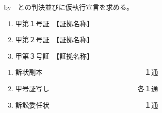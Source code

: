 \documentclass{ltjsarticle}
\begin{document}
{\advance\leftskip by -\parindent
との判決並びに仮執行宣言を求める。\par}

\vspace{1\zw}















\vspace{1\zw}



\begin{enumerate}
  \item 甲第１号証　【証拠名称】
  \item 甲第２号証　【証拠名称】
  \item 甲第３号証　【証拠名称】
\end{enumerate}

\vspace{1\zw}



\begin{enumerate}
  \item 訴状副本　　　　　　　　　　　　　　　１通
  \item 甲号証写し　　　　　　　　　　　　　各１通
  \item 訴訟委任状　　　　　　　　　　　　　　１通
\end{enumerate}

\Ijo[2\zw]
\end{document}
